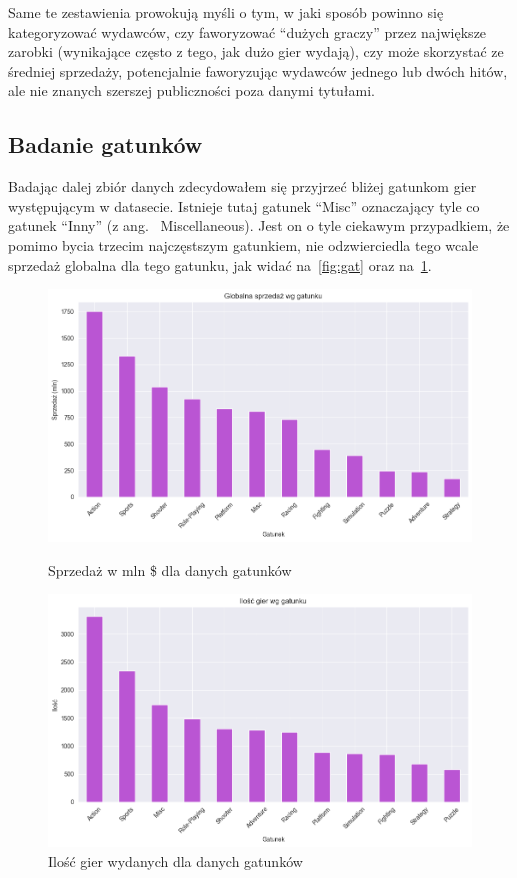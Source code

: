 \documentclass[11pt]{article}
\begin{document}
Same te zestawienia prowokują myśli o tym, w jaki sposób powinno się kategoryzować wydawców, czy faworyzować ``dużych graczy''
przez największe zarobki (wynikające często z tego, jak dużo gier wydają), czy może skorzystać ze średniej sprzedaży,
potencjalnie faworyzując wydawców jednego lub dwóch hitów, ale nie znanych szerszej publiczności poza danymi tytułami.

\subsection{Badanie gatunków}\label{subsec:badanie-gatunkow}
Badając dalej zbiór danych zdecydowałem się przyjrzeć bliżej gatunkom gier występującym w datasecie.
Istnieje tutaj gatunek ``Misc'' oznaczający tyle co gatunek ``Inny'' (z ang.~ Miscellaneous).
Jest on o tyle ciekawym przypadkiem, że pomimo bycia trzecim najczęstszym gatunkiem, nie odzwierciedla tego wcale sprzedaż globalna dla tego gatunku, jak widać na~\ref{fig:gat} oraz na~\ref{fig:gat2}.

\begin{figure}[H]
    \centering
    \begin{minipage}[t]{0.48\linewidth}
        \centering
        \includegraphics[width=\linewidth]{figures/gatunek-sprzedaz}
        \caption{Sprzedaż w mln \$ dla danych gatunków}
        \label{fig:gat}
    \end{minipage}
    \hfill
    \begin{minipage}[t]{0.48\linewidth}
        \centering
        \includegraphics[width=\linewidth]{figures/gatunek-ilosc}
        \caption{Ilość gier wydanych dla danych gatunków}
        \label{fig:gat2}
    \end{minipage}
\end{figure}
\end{document}
